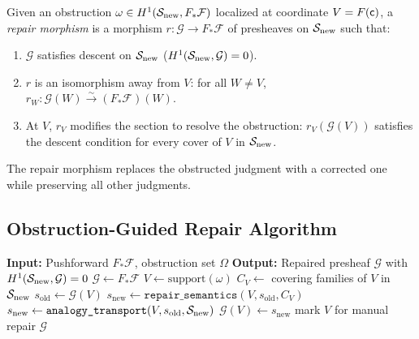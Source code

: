 \documentclass[11pt]{article}
\newcommand{\RepairSem}{\texttt{repair\_semantics}}
\newcommand{\AnalTrans}{\texttt{analogy\_transport}}
\newcommand{\SiteNew}{\Site_{\mathrm{new}}}
\newcommand{\FunctorF}{F}
\newcommand{\Pushforward}{F_*}
\begin{document}
\begin{definition}\label{def:repair-morphism}
Given an obstruction $\omega \in \Hcoh{1}(\SiteNew,
\Pushforward\mathcal{F})$ localized at coordinate $V = \FunctorF(\coord)$,
a \emph{repair morphism} is a morphism $r : \mathcal{G} \to
\Pushforward\mathcal{F}$ of presheaves on $\SiteNew$ such that:
\begin{enumerate}[noitemsep]
  \item $\mathcal{G}$ satisfies descent on $\SiteNew$
        ($\Hcoh{1}(\SiteNew, \mathcal{G}) = 0$).
  \item $r$ is an isomorphism away from $V$: for all $W \neq V$,
        $r_W : \mathcal{G}(W) \xrightarrow{\sim}
        (\Pushforward\mathcal{F})(W)$.
  \item At $V$, $r_V$ modifies the section to resolve the obstruction:
        $r_V(\mathcal{G}(V))$ satisfies the descent condition for every
        cover of $V$ in $\SiteNew$.
\end{enumerate}
The repair morphism replaces the obstructed judgment with a corrected one
while preserving all other judgments.
\end{definition}

\subsection{Obstruction-Guided Repair Algorithm}

\begin{algorithm}[H]
\caption{Obstruction-Guided Repair}
\label{alg:repair}
\begin{algorithmic}[1]
\STATE \textbf{Input:} Pushforward $\Pushforward\mathcal{F}$, obstruction set $\Omega$
\STATE \textbf{Output:} Repaired presheaf $\mathcal{G}$ with $\Hcoh{1}(\SiteNew, \mathcal{G}) = 0$
\STATE $\mathcal{G} \gets \Pushforward\mathcal{F}$
  \STATE $V \gets \mathrm{support}(\omega)$
  \STATE $C_V \gets$ covering families of $V$ in $\SiteNew$
  \STATE $s_{\mathrm{old}} \gets \mathcal{G}(V)$
  \STATE $s_{\mathrm{new}} \gets \RepairSem(V, s_{\mathrm{old}}, C_V)$
    \STATE $s_{\mathrm{new}} \gets \AnalTrans(V, s_{\mathrm{old}}, \SiteNew)$
  \ENDIF
    \STATE $\mathcal{G}(V) \gets s_{\mathrm{new}}$
  \ELSE
    \STATE mark $V$ for manual repair
  \ENDIF
\ENDFOR
\RETURN $\mathcal{G}$
\end{algorithmic}
\end{algorithm}
\end{document}
